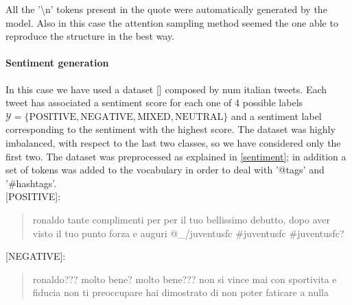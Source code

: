 \documentclass[10pt,twocolumn,letterpaper]{article}
\begin{document}
%
%
%
%

All the '\textbackslash n' tokens present in the quote were automatically generated by the model.
Also in this case the attention sampling method seemed the one able to reproduce the structure in the best way.


\paragraph{Sentiment generation} In this case we have used a dataset [] composed by num italian tweets.
Each tweet has associated a sentiment score for each one of 4 possible labels
$\mathcal Y = \{\text{POSITIVE}, \text{NEGATIVE}, \text{MIXED}, \text{NEUTRAL}\}$ and a sentiment label corresponding
to the sentiment with the highest score.
The dataset was highly imbalanced, with respect to the last two classes, so we have considered only the first two.
The dataset was preprocessed as explained in \ref{sentiment}; in addition a set of tokens was added to the vocabulary
in order to deal with '@tags' and '#hashtags'.\\

[POSITIVE]:
\begin{quote}
   ronaldo tante complimenti per per il tuo bellissimo debutto, dopo aver visto il tuo punto forza e auguri @\_/juventusfc #juventusfc #juventusfc?
\end{quote}

[NEGATIVE]:
\begin{quote}
   ronaldo??? molto bene? molto bene??? non si vince mai con sportivita e fiducia non ti preoccupare hai dimostrato di non poter faticare a nulla
\end{quote}
\end{document}

